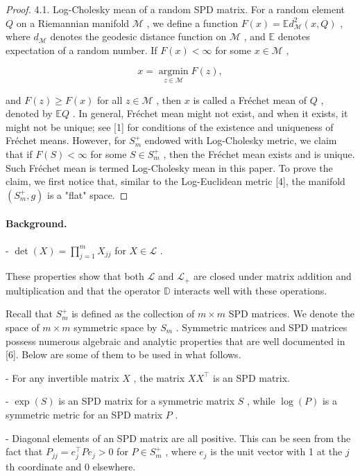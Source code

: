 \documentclass[11pt]{article}
\begin{document}
\begin{proof}
4.1. Log-Cholesky mean of a random SPD matrix. For a random element  $Q$  on a Riemannian manifold  $\mathcal{M}$ , we define a function  $F(x) = \mathbb{E}d_{\mathcal{M}}^2 (x,Q)$ , where  $d_{\mathcal{M}}$  denotes the geodesic distance function on  $\mathcal{M}$ , and  $\mathbb{E}$  denotes expectation of a random number. If  $F(x) < \infty$  for some  $x\in \mathcal{M}$ ,

$$
x = \operatorname * {a r g   m i n} _ {z \in \mathcal {M}} F (z),
$$

and  $F(z) \geq F(x)$  for all  $z \in \mathcal{M}$ , then  $x$  is called a Fréchet mean of  $Q$ , denoted by  $\mathbb{E}Q$ . In general, Fréchet mean might not exist, and when it exists, it might not be unique; see [1] for conditions of the existence and uniqueness of Fréchet means. However, for  $S_{m}^{+}$  endowed with Log-Cholesky metric, we claim that if  $F(S) < \infty$  for some  $S \in S_{m}^{+}$ , then the Fréchet mean exists and is unique. Such Fréchet mean is termed Log-Cholesky mean in this paper. To prove the claim, we first notice that, similar to the Log-Euclidean metric [4], the manifold  $(S_{m}^{+}, g)$  is a "flat" space.

\end{proof}

\paragraph{Background.}
-  $\operatorname{det}(X) = \prod_{j=1}^{m} X_{jj}$  for  $X \in \mathcal{L}$ .

These properties show that both  $\mathcal{L}$  and  $\mathcal{L}_{+}$  are closed under matrix addition and multiplication and that the operator  $\mathbb{D}$  interacts well with these operations.

Recall that  $S_{m}^{+}$  is defined as the collection of  $m \times m$  SPD matrices. We denote the space of  $m \times m$  symmetric space by  $S_{m}$ . Symmetric matrices and SPD matrices possess numerous algebraic and analytic properties that are well documented in [6]. Below are some of them to be used in what follows.

- For any invertible matrix  $X$ , the matrix  $XX^{\top}$  is an SPD matrix.

-  $\exp(S)$  is an SPD matrix for a symmetric matrix  $S$ , while  $\log(P)$  is a symmetric metric for an SPD matrix  $P$ .

- Diagonal elements of an SPD matrix are all positive. This can be seen from the fact that  $P_{jj} = e_j^\top Pe_j > 0$  for  $P \in S_m^+$ , where  $e_j$  is the unit vector with 1 at the  $j$ th coordinate and 0 elsewhere.
\end{document}
